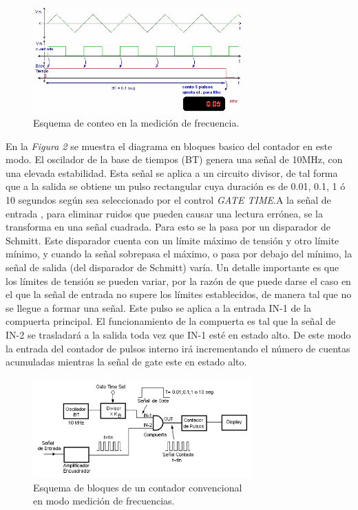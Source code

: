 \documentclass{article}
\begin{document}
\begin{figure}[h]
	\centering
	\includegraphics[width=0.72\textwidth]{images/01-ondasFrecuenciaContador.jpg}
	\medskip
	\caption{Esquema de conteo en la medición de frecuencia.}
\end{figure}
\bigskip\bigskip

	
	En la \textit{Figura 2} se muestra el diagrama en bloques basico del contador en este modo. El oscilador de la base de tiempos (BT) genera una señal de 10MHz, con una elevada estabilidad. Esta señal se aplica a un circuito divisor, de tal forma que a la salida se obtiene un pulso rectangular cuya duración es de 0.01, 0.1, 1 ó 10 segundos según sea seleccionado por el control \textit{GATE TIME}.A la señal de entrada , para eliminar ruidos que pueden causar una lectura errónea, se la transforma en una señal cuadrada. Para esto se la pasa por un disparador de Schmitt. Este disparador cuenta con un límite máximo de tensión y otro límite mínimo, y cuando la señal sobrepasa el máximo, o pasa por debajo del mínimo, la señal de salida (del disparador de Schmitt) varía. Un detalle importante es que los límites de tensión se pueden variar, por la razón de que puede darse el caso en el que la señal de entrada no supere los límites establecidos, de manera tal que no se llegue a formar una señal. Este pulso se aplica a la entrada IN-1 de la compuerta principal. El funcionamiento de la compuerta es tal que la señal de IN-2 se trasladará a la salida toda vez que IN-1 esté en estado alto. De este modo la entrada del contador de pulsos interno irá incrementando el número de cuentas acumuladas mientras la señal de gate este en estado alto. 


\newpage
\begin{figure}[h]
	\centering
	\includegraphics[width=0.75\textwidth]{images/02-diagrama-en-bloques-modo-medicion-frecuencia.jpg}
	\medskip
	\caption{Esquema de bloques de un contador convencional\\ en modo medición de frecuencias.}
\end{figure}
\bigskip\bigskip
\end{document}
